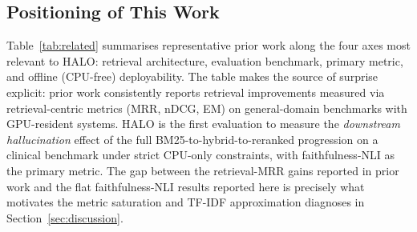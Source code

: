 \documentclass{article}
\begin{document}
\subsection{Positioning of This Work}

\label{sec:positioning}

Table~\ref{tab:related} summarises representative prior work along the four axes most relevant to HALO: retrieval architecture, evaluation benchmark, primary metric, and offline (CPU-free) deployability. The table makes the source of surprise explicit: prior work consistently reports retrieval improvements measured via retrieval-centric metrics (MRR, nDCG, EM) on general-domain benchmarks with GPU-resident systems. HALO is the first evaluation to measure the \emph{downstream hallucination} effect of the full BM25-to-hybrid-to-reranked progression on a clinical benchmark under strict CPU-only constraints, with faithfulness-NLI as the primary metric. The gap between the retrieval-MRR gains reported in prior work and the flat faithfulness-NLI results reported here is precisely what motivates the metric saturation and TF-IDF approximation diagnoses in Section~\ref{sec:discussion}.
\end{document}
